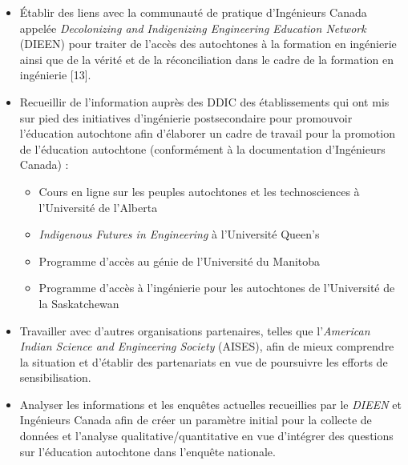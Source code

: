 \begin{itemize}
 \item Établir des liens avec la communauté de pratique d'Ingénieurs Canada appelée \textit{Decolonizing and Indigenizing Engineering Education Network} (DIEEN) pour traiter de l'accès des autochtones à la formation en ingénierie ainsi que de la vérité et de la réconciliation dans le cadre de la formation en ingénierie [13].
 \item Recueillir de l'information auprès des DDIC des établissements qui ont mis sur pied des initiatives d'ingénierie postsecondaire pour promouvoir l'éducation autochtone afin d'élaborer un cadre de travail pour la promotion de l'éducation autochtone (conformément à la documentation d'Ingénieurs Canada) :
 \begin{itemize}
  \item Cours en ligne sur les peuples autochtones et les technosciences à l'Université de l'Alberta
  \item \textit{Indigenous Futures in Engineering} à l'Université Queen's
  \item Programme d'accès au génie de l'Université du Manitoba
  \item Programme d'accès à l'ingénierie pour les autochtones de l'Université de la Saskatchewan
 \end{itemize}
 \item Travailler avec d'autres organisations partenaires, telles que l'\textit{American Indian Science and Engineering Society} (AISES), afin de mieux comprendre la situation et d'établir des partenariats en vue de poursuivre les efforts de sensibilisation.
 \item Analyser les informations et les enquêtes actuelles recueillies par le \textit{DIEEN} et Ingénieurs Canada afin de créer un paramètre initial pour la collecte de données et l'analyse qualitative/quantitative en vue d'intégrer des questions sur l'éducation autochtone dans l'enquête nationale.
\end{itemize}

\newpage
